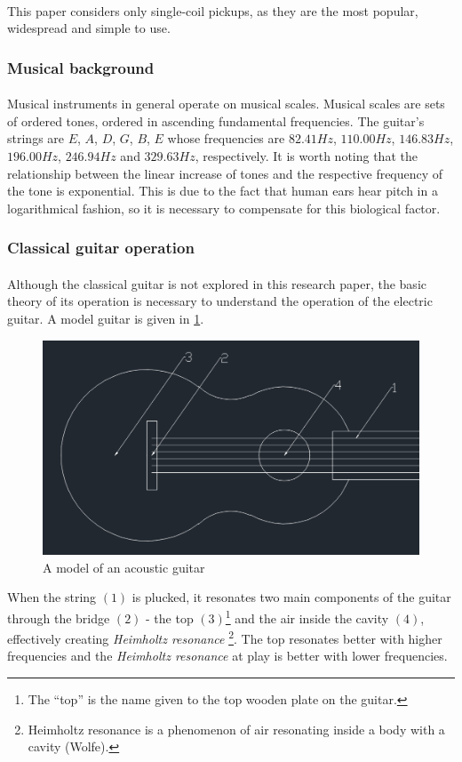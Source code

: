 \documentclass{article}
\begin{document}
\paragraph*{}
This paper considers only single-coil pickups, as they are the most popular,
widespread and simple to use.

\subsubsection{Musical background}

\paragraph*{}
Musical instruments in general operate on musical scales. Musical scales are 
sets of ordered tones, ordered in ascending fundamental frequencies. The 
guitar's strings are $E$, $A$, $D$, $G$, $B$, $E$ whose frequencies are 
$82.41\si{Hz}$, $110.00\si{Hz}$, $146.83\si{Hz}$, $196.00\si{Hz}$, 
$246.94\si{Hz}$ and $329.63\si{Hz}$, respectively. It is worth noting that the 
relationship between the linear increase of tones and the respective frequency 
of the tone is exponential. This is due to the fact that human ears hear pitch 
in a logarithmical fashion, so it is necessary to compensate for this 
biological factor.

\subsubsection{Classical guitar operation}
\paragraph*{}
Although the classical guitar is not explored in this research paper, the basic
theory of its operation is necessary to understand the operation of the 
electric guitar. A model guitar is given in \ref{fig:ac-guitar}.
\begin{figure}[ht]
	\centering
	\includegraphics[width=.5\textwidth]{img/ac-guitar}
	\caption{A model of an acoustic guitar}
	\label{fig:ac-guitar}
\end{figure}
When the string $(1)$ is plucked, it resonates two main components of the 
guitar through the bridge $(2)$ - the top $(3)$\footnote{The ``top'' is the 
name given to the top wooden plate on the guitar.} and the air inside the 
cavity $(4)$, effectively creating \textit{Heimholtz resonance}
\footnote{Heimholtz resonance is a phenomenon of air resonating inside a body 
	with a cavity (Wolfe).}. The top resonates better with higher frequencies 
and the \textit{Heimholtz resonance} at play is better with lower frequencies.
\end{document}
